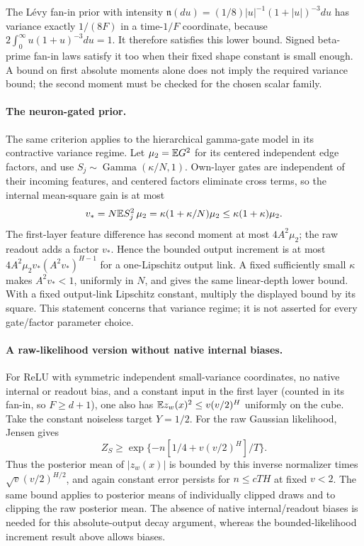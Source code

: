 The L\'evy fan-in prior with intensity
$\mathfrak n(du)=(1/8)|u|^{-1}(1+|u|)^{-3}du$
has variance exactly $1/(8F)$ in a time-$1/F$ coordinate, because
$2\int_0^\infty u(1+u)^{-3}du=1$.
It therefore satisfies this lower bound. Signed beta-prime fan-in laws satisfy it too when their fixed shape constant is small enough. A bound on first absolute moments alone does not imply the required variance bound; the second moment must be checked for the chosen scalar family.

\paragraph{The neuron-gated prior.}
The same criterion applies to the hierarchical gamma-gate model in its contractive variance regime. Let $\mu_2=\mathbb E G^2$ for its centered independent edge factors, and use $S_j\sim\operatorname{Gamma}(\kappa/N,1)$. Own-layer gates are independent of their incoming features, and centered factors eliminate cross terms, so the internal mean-square gain is at most
\[
 v_*=N\mathbb E S_j^2\,\mu_2
      =\kappa(1+\kappa/N)\mu_2
      \le\kappa(1+\kappa)\mu_2.
\]
The first-layer feature difference has second moment at most $4A^2\mu_2$; the raw readout adds a factor $v_*$. Hence the bounded output increment is at most
$4A^2\mu_2v_*(A^2v_*)^{H-1}$ for a one-Lipschitz output link. A fixed sufficiently small $\kappa$ makes $A^2v_*<1$, uniformly in $N$, and gives the same linear-depth lower bound. With a fixed output-link Lipschitz constant, multiply the displayed bound by its square. This statement concerns that variance regime; it is not asserted for every gate/factor parameter choice.

\paragraph{A raw-likelihood version without native internal biases.}
For ReLU with symmetric independent small-variance coordinates, no native internal or readout bias, and a constant input in the first layer (counted in its fan-in, so $F\ge d+1$), one also has
$\mathbb E z_w(x)^2\le v(v/2)^H$ uniformly on the cube.
Take the constant noiseless target $Y=1/2$. For the raw Gaussian likelihood, Jensen gives
\[
 Z_S\ge\exp\{-n[1/4+v(v/2)^H]/T\}.
\]
Thus the posterior mean of $|z_w(x)|$ is bounded by this inverse normalizer times $\sqrt v(v/2)^{H/2}$, and again constant error persists for $n\le cTH$ at fixed $v<2$. The same bound applies to posterior means of individually clipped draws and to clipping the raw posterior mean. The absence of native internal/readout biases is needed for this absolute-output decay argument, whereas the bounded-likelihood increment result above allows biases.


